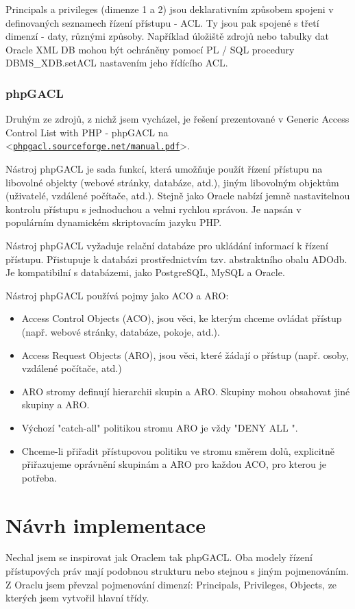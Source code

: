 \documentclass[11pt,twoside,a4paper]{book}
\let\oldUrl\url
\renewcommand\url[1]{<\texttt{\oldUrl{#1}}>}
\begin{document}
Principals a privileges (dimenze 1 a 2) jsou deklarativním způsobem spojeni v definovaných seznamech řízení přístupu - ACL. Ty jsou pak spojené s třetí dimenzí - daty, různými způsoby. Například úložiště zdrojů nebo tabulky dat Oracle XML DB mohou být ochráněny pomocí PL / SQL procedury DBMS\_XDB.setACL nastavením jeho řídícího ACL.


\subsubsection{phpGACL}
Druhým ze zdrojů, z nichž jsem vycházel, je řešení prezentované v Generic Access Control List with PHP - phpGACL na  \url{phpgacl.sourceforge.net/manual.pdf}.

Nástroj phpGACL je sada funkcí, která umožňuje použít řízení přístupu na libovolné objekty (webové stránky, databáze, atd.), jiným libovolným objektům (uživatelé, vzdálené počítače, atd.). 
Stejně jako Oracle nabízí jemně nastavitelnou kontrolu přístupu s jednoduchou a velmi rychlou správou. Je napsán v populárním dynamickém skriptovacím jazyku PHP.

Nástroj phpGACL vyžaduje relační databáze pro ukládání informací k řízení přístupu. Přistupuje k databázi prostřednictvím tzv. abstraktního obalu ADOdb. Je kompatibilní s databázemi, jako PostgreSQL, MySQL a Oracle. 

Nástroj phpGACL používá pojmy jako ACO a ARO:
\begin{itemize}
\item Access Control Objects (ACO), jsou věci, ke kterým chceme ovládat přístup (např. webové stránky, databáze, pokoje, atd.).
\item Access Request Objects (ARO), jsou věci, které žádají o přístup (např. osoby, vzdálené počítače, atd.)
\item ARO stromy definují hierarchii skupin a ARO. Skupiny mohou obsahovat jiné skupiny a ARO.
\item Výchozí "catch-all" politikou stromu ARO je vždy "DENY ALL ".
\item Chceme-li přiřadit přístupovou politiku ve stromu směrem dolů, explicitně přiřazujeme oprávnění skupinám a ARO pro každou ACO, pro kterou je potřeba.
\end{itemize}

\section{Návrh implementace}
Nechal jsem se inspirovat jak Oraclem tak phpGACL. Oba modely řízení přístupových práv mají podobnou strukturu nebo stejnou s jiným pojmenováním. Z Oraclu jsem převzal pojmenování dimenzí: Principals, Privileges, Objects, ze kterých jsem vytvořil hlavní třídy. 
\end{document}
